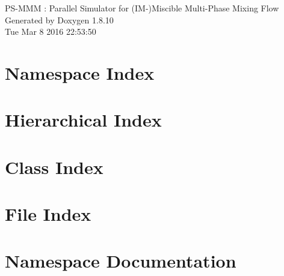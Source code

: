 \documentclass[twoside]{book}
\newcommand{\+}{\discretionary{\mbox{\scriptsize$\hookleftarrow$}}{}{}}
\newcommand{\clearemptydoublepage}{%
  \newpage{\pagestyle{empty}\cleardoublepage}%
}
\begin{document}
\hypersetup{pageanchor=false,
             bookmarks=true,
             bookmarksnumbered=true,
             pdfencoding=unicode
            }
\begin{titlepage}
\vspace*{7cm}
\begin{center}%
{\Large P\+S-\/\+M\+M\+M \+: Parallel Simulator for (I\+M-\/)Miscible Multi-\/\+Phase Mixing Flow }\\
\vspace*{1cm}
{\large Generated by Doxygen 1.8.10}\\
\vspace*{0.5cm}
{\small Tue Mar 8 2016 22:53:50}\\
\end{center}
\end{titlepage}
\clearemptydoublepage
\tableofcontents
\clearemptydoublepage
{}
\hypersetup{pageanchor=true}

\chapter{Namespace Index}

\chapter{Hierarchical Index}

\chapter{Class Index}

\chapter{File Index}

\chapter{Namespace Documentation}




\end{document}
